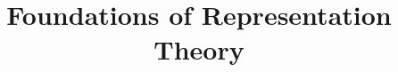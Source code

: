 \title{Foundations of Representation Theory}
\pretitle{\pagestyle{empty}\begin{center}  \Huge \bfseries}
	\renewcommand{\maketitlehookb}{\centering \Large  \textit{Lecture Notes in the Winter Term 2018/19}}
\date{}
